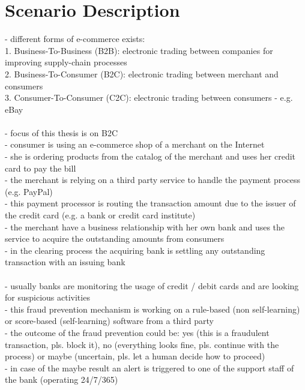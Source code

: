 
\section{Scenario Description}
\label{sec:scenario_description}

- different forms of e-commerce exists: \\
1. Business-To-Business (B2B): electronic trading between companies for improving supply-chain processes \\
2. Business-To-Consumer (B2C): electronic trading between merchant and consumers \\
3. Consumer-To-Consumer (C2C): electronic trading between consumers - e.g. eBay \\
\\
- focus of this thesis is on B2C \\
- consumer is using an e-commerce shop of a merchant on the Internet \\
- she is ordering products from the catalog of the merchant and uses her credit card to pay the bill \\
- the merchant is relying on a third party service to handle the payment process (e.g. PayPal) \\
- this payment processor is routing the transaction amount due to the issuer of the credit card (e.g. a bank or credit card institute) \\
- the merchant have a business relationship with her own bank and uses the service to acquire the outstanding amounts from consumers \\
- in the clearing process the acquiring bank is settling any outstanding transaction with an issuing bank \\
\\
- usually banks are monitoring the usage of credit / debit cards and are looking for suspicious activities \\
- this fraud prevention mechanism is working on a rule-based (non self-learning) or score-based (self-learning) software from a third party \\
- the outcome of the fraud prevention could be: yes (this is a fraudulent transaction, pls. block it), no (everything looks fine, pls. continue with the process) or maybe (uncertain, pls. let a human decide how to proceed) \\
- in case of the maybe result an alert is triggered to one of the support staff of the bank (operating 24/7/365) \\
